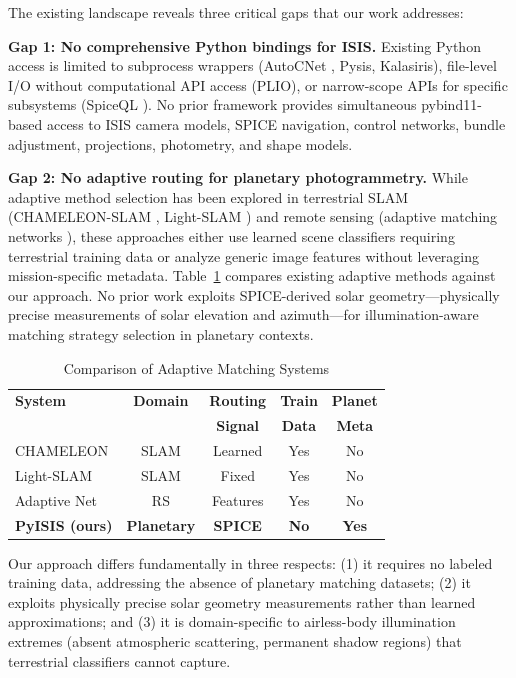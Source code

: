 \documentclass[lettersize,journal]{IEEEtran}
\begin{document}
The existing landscape reveals three critical gaps that our work addresses:

\textbf{Gap 1: No comprehensive Python bindings for ISIS.} Existing Python access is limited to subprocess wrappers (AutoCNet \cite{laura2018autocnet}, Pysis, Kalasiris), file-level I/O without computational API access (PLIO), or narrow-scope APIs for specific subsystems (SpiceQL \cite{usgs2024spiceql}). No prior framework provides simultaneous pybind11-based access to ISIS camera models, SPICE navigation, control networks, bundle adjustment, projections, photometry, and shape models.

\textbf{Gap 2: No adaptive routing for planetary photogrammetry.} While adaptive method selection has been explored in terrestrial SLAM (CHAMELEON-SLAM \cite{syed2026chameleon}, Light-SLAM \cite{lightslam2024}) and remote sensing (adaptive matching networks \cite{adaptive2023}), these approaches either use learned scene classifiers requiring terrestrial training data or analyze generic image features without leveraging mission-specific metadata. Table~\ref{tab:adaptive_comparison} compares existing adaptive methods against our approach. No prior work exploits SPICE-derived solar geometry—physically precise measurements of solar elevation and azimuth—for illumination-aware matching strategy selection in planetary contexts.

\begin{table}[htbp]
\caption{Comparison of Adaptive Matching Systems}
\label{tab:adaptive_comparison}
\centering
\small
\begin{tabular}{@{}lcccc@{}}
\toprule
\textbf{System} & \textbf{Domain} & \textbf{Routing} & \textbf{Train} & \textbf{Planet} \\
 &  & \textbf{Signal} & \textbf{Data} & \textbf{Meta} \\
\midrule
CHAMELEON \cite{syed2026chameleon} & SLAM & Learned & Yes & No \\
Light-SLAM \cite{lightslam2024} & SLAM & Fixed & Yes & No \\
Adaptive Net \cite{adaptive2023} & RS & Features & Yes & No \\
\textbf{PyISIS (ours)} & \textbf{Planetary} & \textbf{SPICE} & \textbf{No} & \textbf{Yes} \\
\bottomrule
\end{tabular}
\end{table}

Our approach differs fundamentally in three respects: (1) it requires no labeled training data, addressing the absence of planetary matching datasets; (2) it exploits physically precise solar geometry measurements rather than learned approximations; and (3) it is domain-specific to airless-body illumination extremes (absent atmospheric scattering, permanent shadow regions) that terrestrial classifiers cannot capture.
\end{document}
